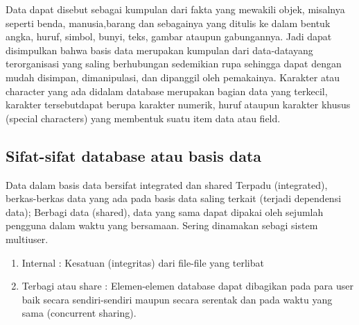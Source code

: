 	Data dapat disebut sebagai kumpulan dari fakta yang mewakili objek, misalnya seperti benda, manusia,barang dan sebagainya yang ditulis ke dalam bentuk angka, huruf, simbol, bunyi, teks, gambar ataupun gabungannya. Jadi dapat disimpulkan bahwa basis data merupakan kumpulan dari data-datayang terorganisasi yang saling berhubungan sedemikian rupa sehingga dapat dengan mudah disimpan, dimanipulasi, dan dipanggil oleh pemakainya. Karakter atau character yang ada didalam database merupakan bagian data yang terkecil, karakter tersebutdapat berupa karakter numerik, huruf ataupun karakter khusus (special characters) yang membentuk suatu item data atau field.

\subsection {Sifat-sifat database atau basis data}
	Data dalam basis data bersifat integrated dan shared Terpadu (integrated), berkas-berkas data yang ada pada basis data saling terkait (terjadi dependensi data);
	Berbagi data (shared), data yang sama dapat dipakai oleh sejumlah pengguna dalam waktu yang bersamaan. Sering dinamakan sebagi sistem multiuser.
	\begin{enumerate}
		\item Internal : Kesatuan (integritas) dari file-file yang terlibat
		\item Terbagi atau share : Elemen-elemen database dapat dibagikan pada para user baik secara sendiri-sendiri maupun secara serentak dan pada waktu yang sama (concurrent sharing).
	\end{enumerate}
 
